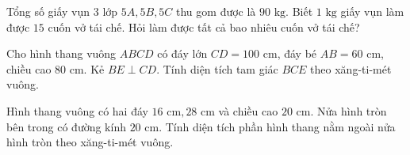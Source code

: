 \begin{ex} %
Tổng số giấy vụn $3$ lớp $5A, 5B, 5C$ thu gom được là $90\text{ kg}$. Biết $1\text{ kg}$ giấy vụn làm được $15$ cuốn vở tái chế. Hỏi làm được tất cả bao nhiêu cuốn vở tái chế?
\end{ex}

\begin{ex} %
Cho hình thang vuông $ABCD$ có đáy lớn $CD = 100\text{ cm}$, đáy bé $AB = 60\text{ cm}$, chiều cao $80\text{ cm}$. Kẻ $BE \perp CD$. Tính diện tích tam giác $BCE$ theo xăng-ti-mét vuông.
\end{ex}

\begin{ex} %
Hình thang vuông có hai đáy $16\text{ cm}, 28\text{ cm}$ và chiều cao $20\text{ cm}$. Nửa hình tròn bên trong có đường kính $20\text{ cm}$. Tính diện tích phần hình thang nằm ngoài nửa hình tròn theo xăng-ti-mét vuông.
\end{ex}
